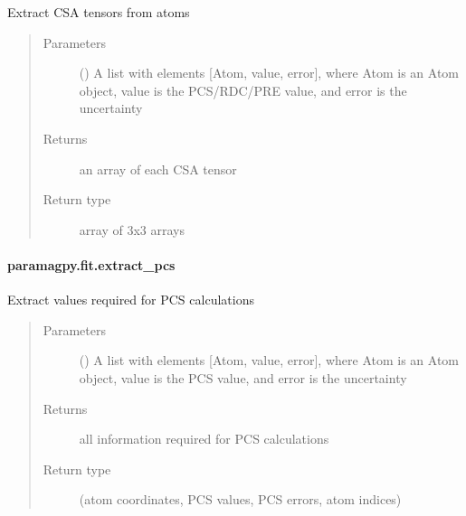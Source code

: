 \documentclass[a4paper,10pt,english,openany,oneside]{sphinxmanual}
\begin{document}
\begin{fulllineitems}
\label{\detokenize{reference/generated/paramagpy.fit.extract_csa:paramagpy.fit.extract_csa}}
Extract CSA tensors from atoms
\begin{quote}\begin{description}
\item[{Parameters}] \leavevmode
{} () \textendash{} A list with elements {[}Atom, value, error{]}, where Atom is
an Atom object, value is the PCS/RDC/PRE value,
and error is the uncertainty

\item[{Returns}] \leavevmode
{} \textendash{} an array of each CSA tensor

\item[{Return type}] \leavevmode
array of 3x3 arrays

\end{description}\end{quote}

\end{fulllineitems}



\paragraph{paramagpy.fit.extract\_pcs}
\label{\detokenize{reference/generated/paramagpy.fit.extract_pcs:paramagpy-fit-extract-pcs}}\label{\detokenize{reference/generated/paramagpy.fit.extract_pcs::doc}}

\begin{fulllineitems}
\label{\detokenize{reference/generated/paramagpy.fit.extract_pcs:paramagpy.fit.extract_pcs}}
Extract values required for PCS calculations
\begin{quote}\begin{description}
\item[{Parameters}] \leavevmode
{} () \textendash{} A list with elements {[}Atom, value, error{]}, where Atom is
an Atom object, value is the PCS value, and error is the uncertainty

\item[{Returns}] \leavevmode
{} \textendash{} all information required for PCS calculations

\item[{Return type}] \leavevmode
(atom coordinates, PCS values, PCS errors, atom indices)

\end{description}\end{quote}

\end{fulllineitems}
\end{document}
